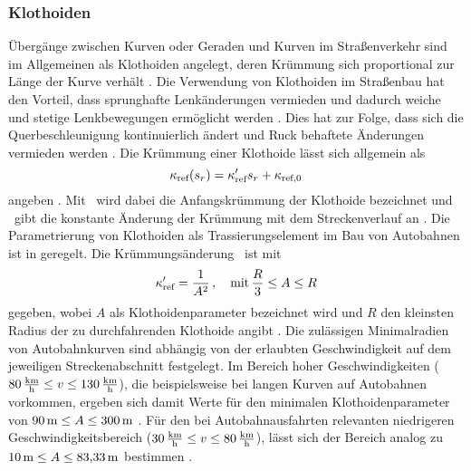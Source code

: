 \subsubsection{Klothoiden}\label{subsubsec:Klothoiden}
Übergänge zwischen Kurven oder Geraden und Kurven im Straßenverkehr sind im Allgemeinen als Klothoiden angelegt, deren Krümmung sich proportional zur Länge der Kurve verhält \cite{ForschungsgesellschaftfurStraenundVerkehrswesen.2008}. Die Verwendung von Klothoiden im Straßenbau hat den Vorteil, dass sprunghafte Lenkänderungen vermieden und dadurch weiche und stetige Lenkbewegungen ermöglicht werden \cite{ForschungsgesellschaftfurStraenundVerkehrswesen.2008}. Dies hat zur Folge, dass sich die Querbeschleunigung kontinuierlich ändert und Ruck behaftete Änderungen vermieden werden \cite{ForschungsgesellschaftfurStraenundVerkehrswesen.2008}. Die Krümmung einer Klothoide lässt sich allgemein als 
\begin{equation}
	\kappa_{\textrm{ref}}(s_r) = \kappa'_{\textrm{ref}} s_r + \kappa_{\textrm{ref},0}
\end{equation}
angeben \cite{Rathgeber.2016}. Mit \kapparefzero~wird dabei die Anfangskrümmung der Klothoide bezeichnet und \dkapparef~gibt die konstante Änderung der Krümmung mit dem Streckenverlauf an \cite{Rathgeber.2016}. Die Parametrierung von Klothoiden als Trassierungselement im Bau von Autobahnen ist in \cite{ForschungsgesellschaftfurStraenundVerkehrswesen.2008} geregelt. Die Krümmungsänderung \dkapparef~ist mit 
\begin{equation}
	\kappa'_{\textrm{ref}} = \frac{1}{A^2}\,,\quad\textrm{mit}\, \frac{R}{3}\leq A\leq R
\end{equation}
gegeben, wobei $A$ als Klothoidenparameter bezeichnet wird und $R$ den kleinsten Radius der zu durchfahrenden Klothoide angibt \cite{ForschungsgesellschaftfurStraenundVerkehrswesen.2008}. Die zulässigen Minimalradien von Autobahnkurven sind abhängig von der erlaubten Geschwindigkeit auf dem jeweiligen Streckenabschnitt festgelegt. Im Bereich hoher Geschwindigkeiten ($80\,\mathrm{\frac{\mathrm{km}}{\mathrm{h}}}\leq v\leq 130\,\mathrm{\frac{\mathrm{km}}{\mathrm{h}}}$), die beispielsweise bei langen Kurven auf Autobahnen vorkommen, ergeben sich damit Werte für den minimalen Klothoidenparameter von $90\,\mathrm{m}\leq A\leq 300\,\mathrm{m}$ \cite{ForschungsgesellschaftfurStraenundVerkehrswesen.2008}. Für den bei Autobahnausfahrten relevanten niedrigeren Geschwindigkeitsbereich ($30\,\mathrm{\frac{\mathrm{km}}{\mathrm{h}}}\leq v\leq 80\,\mathrm{\frac{\mathrm{km}}{\mathrm{h}}}$), lässt sich der Bereich analog zu $10\,\mathrm{m}\leq A\leq 83{,}33\,\mathrm{m}$ bestimmen \cite{ForschungsgesellschaftfurStraenundVerkehrswesen.2008}.
 
